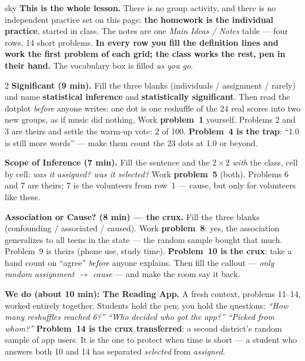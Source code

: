 \documentclass[10pt]{article}
\begin{document}
\boxguard
\begin{skillbox}{sky}
\textbf{This is the whole lesson.} There is no group activity, and there is no independent
practice set on this page: \textbf{the homework is the individual practice}, started in class.
The notes are one \emph{Main Ideas / Notes} table --- four rows, 14 short problems.
\textbf{In every row you fill the definition lines and work the first problem of each grid; the
class works the rest, pen in their hand.} The vocabulary box is filled \emph{as you go}.
\begin{multicols}{2}
\textbf{Significant (9 min).} Fill the three blanks (individuals / assignment / rarely) and
name \textbf{statistical inference} and \textbf{statistically significant}. Then read the
dotplot \emph{before} anyone writes: one dot is one reshuffle of the 24 real scores into two
new groups, as if music did nothing. Work \textbf{problem~1} yourself. Problems 2 and 3 are
theirs and settle the warm-up vote: 2 of 100. \textbf{Problem~4 is the trap}: ``1.0 is still
more words'' --- make them count the 23 dots at 1.0 or beyond.

\textbf{Scope of Inference (7 min).} Fill the sentence and the $2\times2$ \emph{with} the
class, cell by cell: \emph{was it assigned? was it selected?} Work \textbf{problem~5} (both).
Problems 6 and 7 are theirs; 7 is the volunteers from row~1 --- cause, but only for volunteers
like these.

\textbf{Association or Cause? (8 min) --- the crux.} Fill the three blanks (confounding /
associated / caused). Work \textbf{problem~8}: yes, the association generalizes to all teens in
the state --- the random sample bought that much. Problem~9 is theirs (phone use, study time).
\textbf{Problem~10 is the crux}: take a hand count on ``agree'' \emph{before} anyone explains.
Then fill the callout --- \emph{only random assignment $\to$ cause} --- and make the room say
it back.

\columnbreak
\textbf{We do (about 10 min): The Reading App.} A fresh context, problems 11--14, worked
entirely together. Students hold the pen; you hold the questions: \emph{``How many reshuffles
reached 6?''} \quad \emph{``Who decided who got the app?''} \quad \emph{``Picked from whom?''}
\textbf{Problem~14 is the crux transferred}: a second district's random sample of app users.
It is the one to protect when time is short --- a student who answers both 10 and 14 has
separated \emph{selected} from \emph{assigned}.


\end{multicols}
\end{skillbox}
\end{document}
